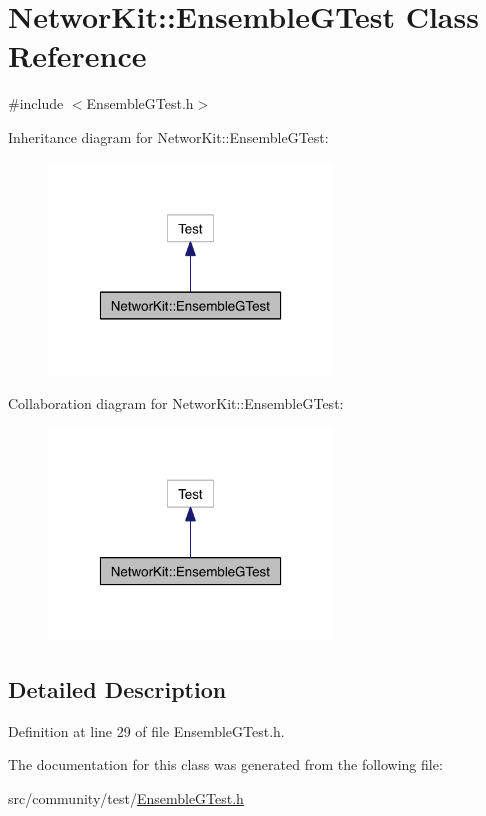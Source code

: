 \hypertarget{class_networ_kit_1_1_ensemble_g_test}{\section{Networ\-Kit\-:\-:Ensemble\-G\-Test Class Reference}
\label{class_networ_kit_1_1_ensemble_g_test}
}


{\ttfamily \#include $<$Ensemble\-G\-Test.\-h$>$}



Inheritance diagram for Networ\-Kit\-:\-:Ensemble\-G\-Test\-:\nopagebreak
\begin{figure}[H]
\begin{center}
\leavevmode
\includegraphics[width=214pt]{class_networ_kit_1_1_ensemble_g_test__inherit__graph}
\end{center}
\end{figure}


Collaboration diagram for Networ\-Kit\-:\-:Ensemble\-G\-Test\-:\nopagebreak
\begin{figure}[H]
\begin{center}
\leavevmode
\includegraphics[width=214pt]{class_networ_kit_1_1_ensemble_g_test__coll__graph}
\end{center}
\end{figure}


\subsection{Detailed Description}


Definition at line 29 of file Ensemble\-G\-Test.\-h.



The documentation for this class was generated from the following file\-:\begin{DoxyCompactItemize}
\item 
src/community/test/\hyperlink{_ensemble_g_test_8h}{Ensemble\-G\-Test.\-h}\end{DoxyCompactItemize}
